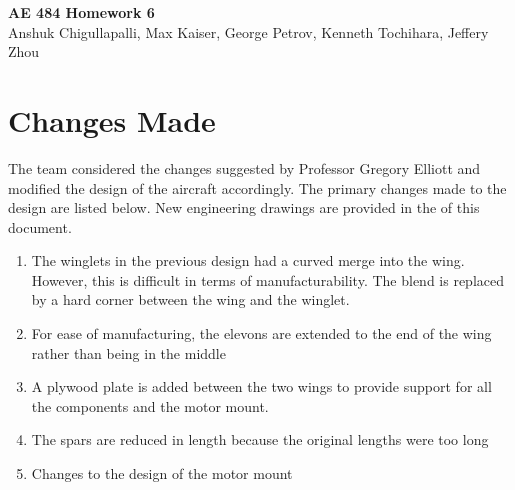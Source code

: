 




\begin{center}
    {\Large\textbf{AE 484 Homework 6}}\\
    Anshuk Chigullapalli, Max Kaiser, George Petrov, Kenneth Tochihara, Jeffery Zhou\\
\end{center}

\section{Changes Made}

    The team considered the changes suggested by Professor Gregory Elliott and modified the design of the aircraft accordingly. The primary changes made to the design are listed below. New engineering drawings are provided in the       of this document.
    
    \begin{enumerate}
        \item The winglets in the previous design had a curved merge into the wing. However, this is difficult in terms of manufacturability. The blend is replaced by a hard corner between the wing and the winglet.
        \item For ease of manufacturing, the elevons are extended to the end of the wing rather than being in the middle
        \item A plywood plate is added between the two wings to provide support for all the components and the motor mount.
        \item The spars are reduced in length because the original lengths were too long
        \item Changes to the design of the motor mount
    \end{enumerate}
    
